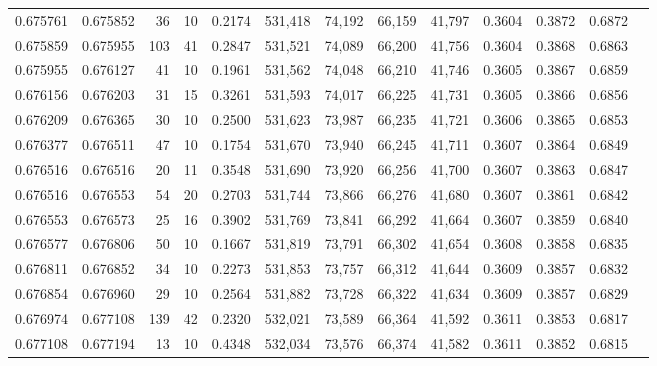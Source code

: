 \begin{tabular}{rrrrrrrrrrrrr}
0.675761 & 0.675852 &    36 &  10 &                                     0.2174 & 531,418 &  74,192 &  66,159 &  41,797 & 0.3604 & 0.3872 & 0.6872 \\
0.675859 & 0.675955 &   103 &  41 &                                     0.2847 & 531,521 &  74,089 &  66,200 &  41,756 & 0.3604 & 0.3868 & 0.6863 \\
0.675955 & 0.676127 &    41 &  10 &                                     0.1961 & 531,562 &  74,048 &  66,210 &  41,746 & 0.3605 & 0.3867 & 0.6859 \\
0.676156 & 0.676203 &    31 &  15 &                                     0.3261 & 531,593 &  74,017 &  66,225 &  41,731 & 0.3605 & 0.3866 & 0.6856 \\
0.676209 & 0.676365 &    30 &  10 &                                     0.2500 & 531,623 &  73,987 &  66,235 &  41,721 & 0.3606 & 0.3865 & 0.6853 \\
0.676377 & 0.676511 &    47 &  10 &                                     0.1754 & 531,670 &  73,940 &  66,245 &  41,711 & 0.3607 & 0.3864 & 0.6849 \\
0.676516 & 0.676516 &    20 &  11 &                                     0.3548 & 531,690 &  73,920 &  66,256 &  41,700 & 0.3607 & 0.3863 & 0.6847 \\
0.676516 & 0.676553 &    54 &  20 &                                     0.2703 & 531,744 &  73,866 &  66,276 &  41,680 & 0.3607 & 0.3861 & 0.6842 \\
0.676553 & 0.676573 &    25 &  16 &                                     0.3902 & 531,769 &  73,841 &  66,292 &  41,664 & 0.3607 & 0.3859 & 0.6840 \\
0.676577 & 0.676806 &    50 &  10 &                                     0.1667 & 531,819 &  73,791 &  66,302 &  41,654 & 0.3608 & 0.3858 & 0.6835 \\
0.676811 & 0.676852 &    34 &  10 &                                     0.2273 & 531,853 &  73,757 &  66,312 &  41,644 & 0.3609 & 0.3857 & 0.6832 \\
0.676854 & 0.676960 &    29 &  10 &                                     0.2564 & 531,882 &  73,728 &  66,322 &  41,634 & 0.3609 & 0.3857 & 0.6829 \\
0.676974 & 0.677108 &   139 &  42 &                                     0.2320 & 532,021 &  73,589 &  66,364 &  41,592 & 0.3611 & 0.3853 & 0.6817 \\
0.677108 & 0.677194 &    13 &  10 &                                     0.4348 & 532,034 &  73,576 &  66,374 &  41,582 & 0.3611 & 0.3852 & 0.6815 \\

\end{tabular}
